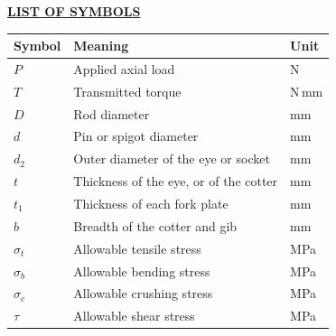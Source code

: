 \documentclass[12pt,a4paper]{report}
\newcommand{\fmhead}[1]{\begin{center}{\fontsize{16}{20}\selectfont\bfseries\underline{#1}}\end{center}\vspace{2mm}}
\begin{document}
\clearpage\singlespacing
{}
\renewcommand{\contentsname}{TABLE OF CONTENTS}
\renewcommand{\cftchapfont}{\small\bfseries}
\renewcommand{\cftchappagefont}{\bfseries}
\setlength{\cftbeforechapskip}{2pt}
\setlength{\cftbeforesecskip}{0pt}
\renewcommand{\cftchapdotsep}{\cftdotsep}
\renewcommand{\cftsecfont}{\footnotesize}\renewcommand{\cftsecpagefont}{\footnotesize}
\setlength{\cftsecindent}{9mm}\setlength{\cftsecnumwidth}{9mm}
\setlength{\cftchapnumwidth}{9mm}
\renewcommand{\cftchappresnum}{}
\renewcommand{\cftfigfont}{\footnotesize}\renewcommand{\cfttabfont}{\footnotesize}
\renewcommand{\cftfigpresnum}{Figure~}\renewcommand{\cfttabpresnum}{Table~}
\setlength{\cftfignumwidth}{18mm}\setlength{\cfttabnumwidth}{15mm}
\setlength{\cftbeforefigskip}{2pt}\setlength{\cftbeforetabskip}{2pt}
\tableofcontents
\vspace{4mm}
\renewcommand{\listfigurename}{LIST OF FIGURES}
\listoffigures
\vspace{4mm}
\renewcommand{\listtablename}{LIST OF TABLES}
\listoftables
\vspace{4mm}
\fmhead{LIST OF SYMBOLS}
\footnotesize
\begin{tabularx}{\textwidth}{@{}l X l@{}}
\toprule Symbol & Meaning & Unit\\\midrule
$P$ & Applied axial load & N\\
$T$ & Transmitted torque & N\,mm\\
$D$ & Rod diameter & mm\\
$d$ & Pin or spigot diameter & mm\\
$d_2$ & Outer diameter of the eye or socket & mm\\
$t$ & Thickness of the eye, or of the cotter & mm\\
$t_1$ & Thickness of each fork plate & mm\\
$b$ & Breadth of the cotter and gib & mm\\
$\sigma_t$ & Allowable tensile stress & MPa\\
$\sigma_b$ & Allowable bending stress & MPa\\
$\sigma_c$ & Allowable crushing stress & MPa\\
$\tau$ & Allowable shear stress & MPa\\
\bottomrule\end{tabularx}
\end{document}
